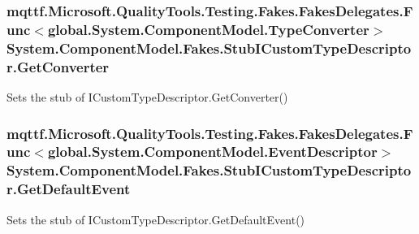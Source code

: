 \hypertarget{class_system_1_1_component_model_1_1_fakes_1_1_stub_i_custom_type_descriptor_adc794304cbf6fc8aa7103a0105d42f34}{
\subsubsection[{Get\-Converter}]{\setlength{\rightskip}{0pt plus 5cm}mqttf.\-Microsoft.\-Quality\-Tools.\-Testing.\-Fakes.\-Fakes\-Delegates.\-Func$<$global.\-System.\-Component\-Model.\-Type\-Converter$>$ System.\-Component\-Model.\-Fakes.\-Stub\-I\-Custom\-Type\-Descriptor.\-Get\-Converter}}\label{class_system_1_1_component_model_1_1_fakes_1_1_stub_i_custom_type_descriptor_adc794304cbf6fc8aa7103a0105d42f34}


Sets the stub of I\-Custom\-Type\-Descriptor.\-Get\-Converter()

\hypertarget{class_system_1_1_component_model_1_1_fakes_1_1_stub_i_custom_type_descriptor_aa3806b60215f5fd094fbdcda0c5c60b5}{
\subsubsection[{Get\-Default\-Event}]{\setlength{\rightskip}{0pt plus 5cm}mqttf.\-Microsoft.\-Quality\-Tools.\-Testing.\-Fakes.\-Fakes\-Delegates.\-Func$<$global.\-System.\-Component\-Model.\-Event\-Descriptor$>$ System.\-Component\-Model.\-Fakes.\-Stub\-I\-Custom\-Type\-Descriptor.\-Get\-Default\-Event}}\label{class_system_1_1_component_model_1_1_fakes_1_1_stub_i_custom_type_descriptor_aa3806b60215f5fd094fbdcda0c5c60b5}


Sets the stub of I\-Custom\-Type\-Descriptor.\-Get\-Default\-Event()

